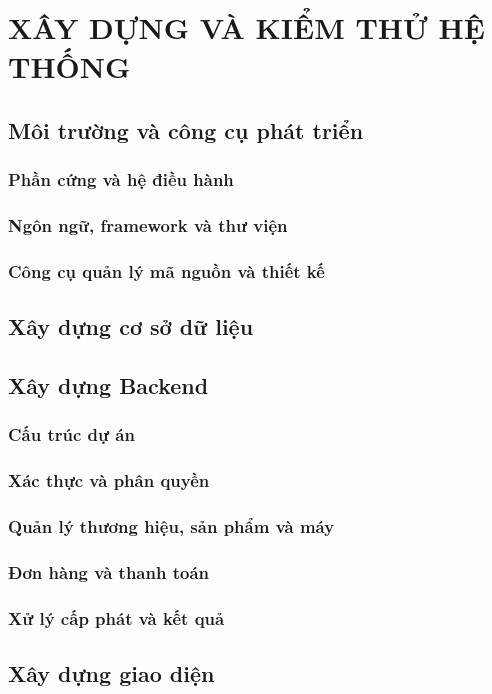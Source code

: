 \chapter{XÂY DỰNG VÀ KIỂM THỬ HỆ THỐNG}
\section{Môi trường và công cụ phát triển}
\subsection{Phần cứng và hệ điều hành}
\subsection{Ngôn ngữ, framework và thư viện}
\subsection{Công cụ quản lý mã nguồn và thiết kế}
\section{Xây dựng cơ sở dữ liệu}
\section{Xây dựng Backend}
\subsection{Cấu trúc dự án}
\subsection{Xác thực và phân quyền}
\subsection{Quản lý thương hiệu, sản phẩm và máy}
\subsection{Đơn hàng và thanh toán}
\subsection{Xử lý cấp phát và kết quả}
\section{Xây dựng giao diện}
